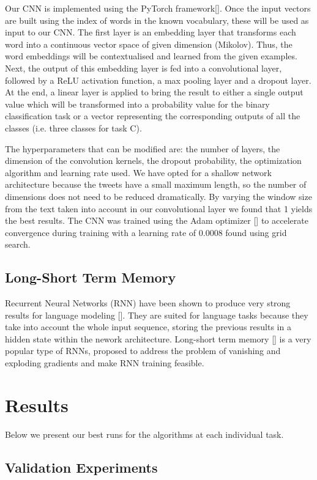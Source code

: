 \documentclass[11pt,a4paper]{article}
\begin{document}
Our CNN is implemented using the PyTorch framework[]. Once the input vectors are built using the index of words in the known vocabulary, these will be used as input to our CNN. The first layer is an embedding layer that transforms each word into a continuous vector space of given dimension (Mikolov). Thus, the word embeddings will be contextualised and learned from the given examples. Next, the output of this embedding layer is fed into a convolutional layer, followed by a ReLU activation function, a max pooling layer and a dropout layer. At the end, a linear layer is applied to bring the result to either a single output value which will be transformed into a probability value for the binary classification task or a vector representing the corresponding outputs of all the classes (i.e. three classes for task C).

The hyperparameters that can be modified are: the number of layers, the dimension of the convolution kernels, the dropout probability, the optimization algorithm and learning rate used. We have opted for a shallow network architecture because the tweets have a small maximum length, so the number of dimensions does not need to be reduced dramatically. By varying the window size from the text taken into account in our convolutional layer we found that 1 yields the best results. The CNN was trained using the Adam optimizer [] to accelerate convergence during training with a learning rate of 0.0008 found using grid search.

\subsection{Long-Short Term Memory}

Recurrent Neural Networks (RNN) have been shown to produce very strong results for language modeling []. They are suited for language tasks because they take into account the whole input sequence, storing the previous results in a hidden state within the nework architecture. Long-short term memory [] is a very popular type of RNNs, proposed to address the problem of vanishing and exploding gradients and make RNN training feasible.

\section{Results}

Below we present our best runs for the algorithms at each individual task.

\subsection{Validation Experiments}
\end{document}
